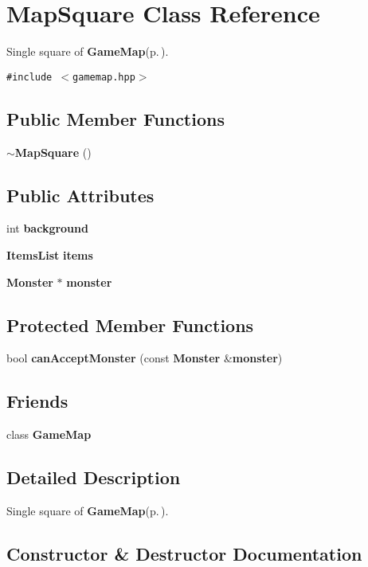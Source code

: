 \section{Map\-Square Class Reference}
\label{classMapSquare}
Single square of {\bf Game\-Map}{\rm (p.\,\pageref{classGameMap})}.  


{\tt \#include $<$gamemap.hpp$>$}

\subsection*{Public Member Functions}
\begin{CompactItemize}
\item 
{\bf $\sim$Map\-Square} ()
\end{CompactItemize}
\subsection*{Public Attributes}
\begin{CompactItemize}
\item 
int {\bf background}
\item 
{\bf Items\-List} {\bf items}
\item 
{\bf Monster} $\ast$ {\bf monster}
\end{CompactItemize}
\subsection*{Protected Member Functions}
\begin{CompactItemize}
\item 
bool {\bf can\-Accept\-Monster} (const {\bf Monster} \&{\bf monster})
\end{CompactItemize}
\subsection*{Friends}
\begin{CompactItemize}
\item 
class {\bf Game\-Map}
\end{CompactItemize}


\subsection{Detailed Description}
Single square of {\bf Game\-Map}{\rm (p.\,\pageref{classGameMap})}. 



\subsection{Constructor \& Destructor Documentation}
